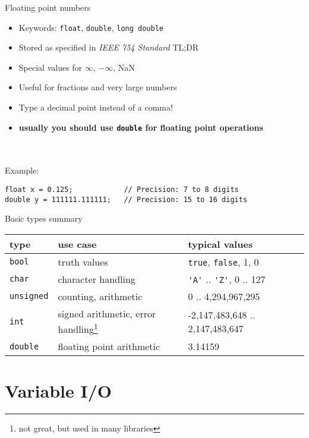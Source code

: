 \begin{frame}[fragile]{Floating point numbers}
    \begin{itemize}
        \item Keywords: \lstinline{float}, \lstinline{double}, \lstinline{long double}
        \item Stored as specified in \textit{IEEE 754 Standard} TL;DR
        \item Special values for $\infty$, $-\infty$, NaN
        \item Useful for fractions and very large numbers
        \item Type a decimal point instead of a comma!
        \item \textbf{usually you should use \lstinline{double} for floating point operations}
    \end{itemize}\ \\
    \ \\
    Example:
    \begin{lstlisting}[numbers=none]
float x = 0.125;            // Precision: 7 to 8 digits
double y = 111111.111111;   // Precision: 15 to 16 digits
\end{lstlisting}
\end{frame}

\begin{frame}{Basic types summary}
    \centering
    \renewcommand{\arraystretch}{1.5}
    \begin{tabularx}{0.9\linewidth}{|l|X|X|}
        \hline
        \textbf{type} & \textbf{use case} & \textbf{typical values}\\
        \hline
        \lstinline{bool} & truth values & \lstinline{true}, \lstinline{false}, 1, 0\\
        \lstinline{char} & character handling & \lstinline{'A'} .. \lstinline{'Z'}, 0 .. 127\\
        \lstinline{unsigned} & counting, arithmetic & 0 .. 4,294,967,295 \\
        \lstinline{int} & signed arithmetic, error handling\footnote{not great, but used in many libraries} & -2,147,483,648 .. 2,147,483,647 \\
        \lstinline{double} & floating point arithmetic & 3.14159 \\
        \hline
    \end{tabularx} 
\end{frame}

\section{Variable I/O}

